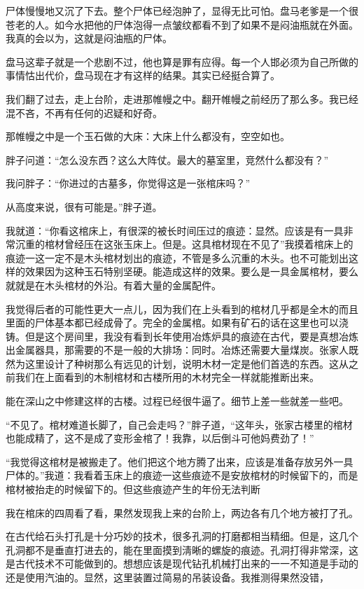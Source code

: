 尸体慢慢地又沉了下去。整个尸体已经泡肿了，显得无比可怕。盘马老爹是一个很苍老的人。如今水把他的尸体泡得一点皱纹都看不到了如果不是闷油瓶就在外面。我真的会以为，这就是闷油瓶的尸体。

盘马这辈子就是一个悲剧不过，他也算是罪有应得。每一个人邯必须为自己所做的事情怙出代价，盘马现在才有这样的结果。其实已经挺合算了。

我们翻了过去，走上台阶，走进那帷幔之中。翻开帷幔之前经历了那么多。我已经混不吝，不再有任何的迟疑和好奇。

那帷幔之中是一个玉石做的大床：大床上什么都没有，空空如也。

胖子问道：“怎么没东西？这么大阵仗。最大的墓室里，竞然什么都没有？”

我问胖子：“你进过的古墓多，你觉得这是一张棺床吗？”

从高度来说，很有可能是。”胖子道。

我就道：“你看这棺床上，有很深的被长时间压过的痕迹：显然。应该是有一具非常沉重的棺材曾经压在这张玉床上。但是。这具棺材现在不见了”我摸着棺床上的痕迹一这一定不是木头棺材划出的痕迹，不管是多么沉重的木头。也不可能划出这样的效果因为这种玉石特别坚硬。能造成这样的效果。要么是一具金属棺材，要么就就是在木头棺材的外沿。有着大量的金属配件。

我觉得后者的可能性更大一点儿，因为我们在上头看到的棺材几乎都是全木的而且里面的尸体基本都已经成骨了。完全的金属棺。如果有矿石的话在这里也可以浇铸。但是这个房间里，我没有看到长年使用冶炼炉具的痕迹在古代，要是真想冶炼出金属器具，那需要的不是一般的大排场：同时。冶炼还需要大量煤炭。张家人既然为这里设计了种树那么有远见的计划，说明木材一定是他们首选的东西。这从之前我们在上面看到的木制棺材和古楼所用的木材完全一样就能推断出来。

能在深山之中修建这样的古楼。过程已经很牛逼了。细节上差一些就差一些吧。

“不见了。棺材难道长脚了，自己会走吗？”胖子道，“这年头，张家古楼里的棺材也能成精了，这不是成了变形金棺了！我靠，以后倒斗可他妈费劲了！”

“我觉得这棺材是被搬走了。他们把这个地方腾了出来，应该是准备存放另外一具尸体的。”我道：我看着玉床上的痕迹一这些痕迹不是安放棺材的时候留下的，而是棺材被抬走的时候留下的。但这些痕迹产生的年份无法判断

我在棺床的四周看了看，果然发现我上来的台阶上，两边各有几个地方被打了孔。

在古代给石头打孔是十分巧妙的技术，很多孔洞的打磨都相当精细。但是，这几个孔洞都不是垂直打进去的，能在里面摸到淸晰的螺旋的痕迹。孔洞打得非常深，这是古代技术不可能做到的。想想应该是现代钻孔机械打出来的一一不知道是手动的还是使用汽油的。显然，这里装置过简易的吊装设备。我推测得果然没错，

